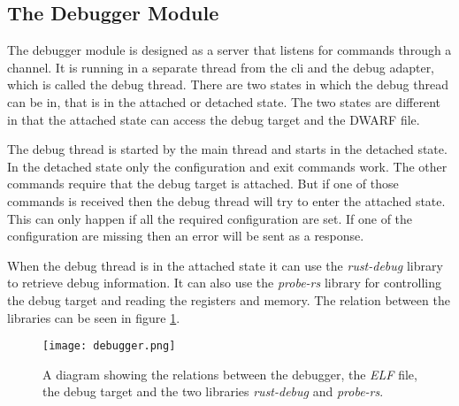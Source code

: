 




\subsection{The Debugger Module}
The debugger module is designed as a server that listens for commands through a channel.
It is running in a separate thread from the \acrshort{cli} and the debug adapter, which is called the debug thread.
There are two states in which the debug thread can be in, that is in the attached or detached state.
The two states are different in that the attached state can access the debug target and the \gls{DWARF} file.


The debug thread is started by the main thread and starts in the detached state.
In the detached state only the configuration and exit commands work.
The other commands require that the debug target is attached.
But if one of those commands is received then the debug thread will try to enter the attached state.
This can only happen if all the required configuration are set.
If one of the configuration are missing then an error will be sent as a response.


When the debug thread is in the attached state it can use the \emph{rust-debug} library to retrieve debug information.
It can also use the \emph{probe-rs} library for controlling the debug target and reading the registers and memory.
The relation between the libraries can be seen in figure \ref{fig:debugger}.


\begin{figure}[h]
	\centering
	\texttt{[image: debugger.png]}
	\caption{A diagram showing the relations between the debugger, the \emph{ELF} file, the debug target and the two libraries \emph{rust-debug} and \emph{probe-rs}.}
	\label{fig:debugger}
\end{figure}



